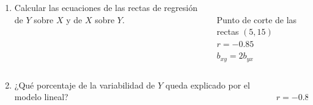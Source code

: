 \documentclass[aspectratio=149,10pt,xcolor=dvipsnames,t]{beamer}
\begin{document}
\begin{frame}
\begin{columns}
\begin{column}[T]{0.55\textwidth}
\begin{enumerate}
\item Calcular las ecuaciones de las rectas de regresión de $Y$ sobre $X$ y de $X$ sobre $Y$.
\end{enumerate}
\end{column}
\begin{column}[T]{0.45\textwidth}
\\
Punto de corte de las rectas $(5,15)$\\
$r=-0.85$\\
$b_{xy}=2b_{yx}$
\end{column}
\end{columns}
\end{frame}


\begin{frame}
\begin{columns}
\begin{column}[T]{0.55\textwidth}
\begin{enumerate}
\setcounter{enumi}{1}
\item ¿Qué porcentaje de la variabilidad de $Y$ queda explicado por el modelo lineal?
\end{enumerate}
\end{column}
\begin{column}[T]{0.45\textwidth}
\\
$r=-0.85$
\end{column}
\end{columns}
\end{frame}
\end{document}
